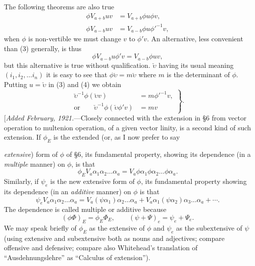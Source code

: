 \documentclass[11pt]{article}
\begin{document}
\indent The following theorems are also true
\begin{align}\phi V_{a+b}uv&=V_{a+b}\phi u\phi v,\tag{2}\\\phi V_{a-b}uv&=V_{a-b}\phi u\phi'^{-1}v,\tag{3}\end{align}
when $\phi$ is non-vertible we must change $v$ to $\phi'v$. An alternative, less convenient than (3) generally, is thus
\begin{equation}\phi V_{a-b}u\phi'v=V_{a-b}\phi uv,\tag{4}\end{equation}
but this alternative is true without qualification. $\breve\upsilon$ having its usual meaning $(i_1,i_2,\ldots i_n)$ it is easy to see that $\phi\breve\upsilon=m\breve\upsilon$ where $m$ is the determinant of $\phi$. Putting $u=\breve\upsilon$ in (3) and (4) we obtain
\begin{equation}\left.\begin{aligned}\breve\upsilon^{-1}\phi(\breve\upsilon v)&=m\phi'^{-1}v,\\\text{or}\qquad\breve\upsilon^{-1}\phi(\breve\upsilon\phi'v)&=mv\end{aligned}\right\}.\tag{5}\end{equation}
[\emph{Added February, 1921.}---Closely connected with the extension in §6 from vector operation to multenion operation, of a given vector linity, is a second kind of such extension. If $\phi_E$ is the extended (or, as I now prefer to say

\emph{extensive}) form of $\phi$ of §6, its fundamental property, showing its dependence (in a \emph{multiple} manner) on $\phi$, is that
\begin{equation}\phi_E V_a\alpha_1\alpha_2\ldots\alpha_a=V_a\phi\alpha_1\phi\alpha_2\ldots\phi\alpha_a.\tag{1}\end{equation}
Similarly, if $\psi_e$ is the new extensive form of $\phi$, its fundamental property showing its dependence (in an \emph{additive} manner) on $\phi$ is that
\begin{equation}\psi_eV_a\alpha_1\alpha_2\ldots\alpha_a=V_a(\psi\alpha_1)\alpha_2\ldots\alpha_a+V_a\alpha_1(\psi\alpha_2)\alpha_3\ldots\alpha_a+\cdots.\tag{2}\end{equation}
The dependence is called multiple or additive because
\begin{equation}(\phi\Phi)_E=\phi_E\Phi_E,\qquad(\psi+\Psi)_e=\psi_e+\Psi_e.\tag{3}\end{equation}
We may speak briefly of $\phi_E$ as the extensive of $\phi$ and $\psi_e$ as the subextensive of $\psi$ (using extensive and subextensive both as nouns and adjectives; compare offensive and defensive; compare also Whitehead's translation of ``Ausdehnungslehre'' as ``Calculus of extension'').
\end{document}
